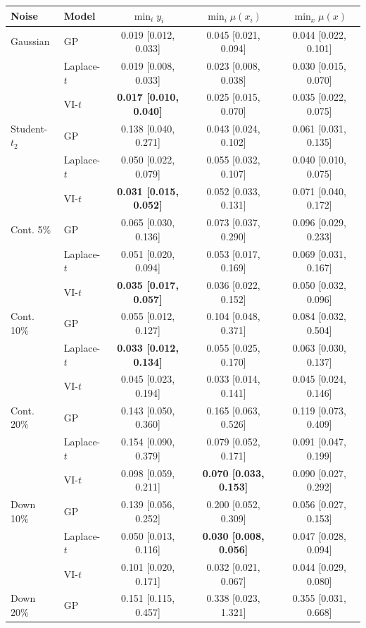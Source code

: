 \begin{tabular}{llccc}
\toprule
Noise & Model & $\min_i y_i$ & $\min_i \mu(x_i)$ & $\min_x \mu(x)$ \\
\midrule
Gaussian & GP & 0.019 [0.012, 0.033] & 0.045 [0.021, 0.094] & 0.044 [0.022, 0.101] \\
 & Laplace-$t$ & 0.019 [0.008, 0.033] & 0.023 [0.008, 0.038] & 0.030 [0.015, 0.070] \\
 & VI-$t$ & \textbf{0.017 [0.010, 0.040]} & 0.025 [0.015, 0.070] & 0.035 [0.022, 0.075] \\
\midrule
Student-$t_2$ & GP & 0.138 [0.040, 0.271] & 0.043 [0.024, 0.102] & 0.061 [0.031, 0.135] \\
 & Laplace-$t$ & 0.050 [0.022, 0.079] & 0.055 [0.032, 0.107] & 0.040 [0.010, 0.075] \\
 & VI-$t$ & \textbf{0.031 [0.015, 0.052]} & 0.052 [0.033, 0.131] & 0.071 [0.040, 0.172] \\
\midrule
Cont. 5\% & GP & 0.065 [0.030, 0.136] & 0.073 [0.037, 0.290] & 0.096 [0.029, 0.233] \\
 & Laplace-$t$ & 0.051 [0.020, 0.094] & 0.053 [0.017, 0.169] & 0.069 [0.031, 0.167] \\
 & VI-$t$ & \textbf{0.035 [0.017, 0.057]} & 0.036 [0.022, 0.152] & 0.050 [0.032, 0.096] \\
\midrule
Cont. 10\% & GP & 0.055 [0.012, 0.127] & 0.104 [0.048, 0.371] & 0.084 [0.032, 0.504] \\
 & Laplace-$t$ & \textbf{0.033 [0.012, 0.134]} & 0.055 [0.025, 0.170] & 0.063 [0.030, 0.137] \\
 & VI-$t$ & 0.045 [0.023, 0.194] & 0.033 [0.014, 0.141] & 0.045 [0.024, 0.146] \\
\midrule
Cont. 20\% & GP & 0.143 [0.050, 0.360] & 0.165 [0.063, 0.526] & 0.119 [0.073, 0.409] \\
 & Laplace-$t$ & 0.154 [0.090, 0.379] & 0.079 [0.052, 0.171] & 0.091 [0.047, 0.199] \\
 & VI-$t$ & 0.098 [0.059, 0.211] & \textbf{0.070 [0.033, 0.153]} & 0.090 [0.027, 0.292] \\
\midrule
Down 10\% & GP & 0.139 [0.056, 0.252] & 0.200 [0.052, 0.309] & 0.056 [0.027, 0.153] \\
 & Laplace-$t$ & 0.050 [0.013, 0.116] & \textbf{0.030 [0.008, 0.056]} & 0.047 [0.028, 0.094] \\
 & VI-$t$ & 0.101 [0.020, 0.171] & 0.032 [0.021, 0.067] & 0.044 [0.029, 0.080] \\
\midrule
Down 20\% & GP & 0.151 [0.115, 0.457] & 0.338 [0.023, 1.321] & 0.355 [0.031, 0.668] \\

\end{tabular}
